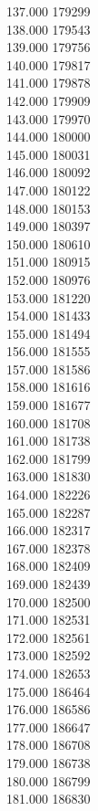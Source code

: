 { 137.000	179299 \\
 138.000	179543 \\
 139.000	179756 \\
 140.000	179817 \\
 141.000	179878 \\
 142.000	179909 \\
 143.000	179970 \\
 144.000	180000 \\
 145.000	180031 \\
 146.000	180092 \\
 147.000	180122 \\
 148.000	180153 \\
 149.000	180397 \\
 150.000	180610 \\
 151.000	180915 \\
 152.000	180976 \\
 153.000	181220 \\
 154.000	181433 \\
 155.000	181494 \\
 156.000	181555 \\
 157.000	181586 \\
 158.000	181616 \\
 159.000	181677 \\
 160.000	181708 \\
 161.000	181738 \\
 162.000	181799 \\
 163.000	181830 \\
 164.000	182226 \\
 165.000	182287 \\
 166.000	182317 \\
 167.000	182378 \\
 168.000	182409 \\
 169.000	182439 \\
 170.000	182500 \\
 171.000	182531 \\
 172.000	182561 \\
 173.000	182592 \\
 174.000	182653 \\
 175.000	186464 \\
 176.000	186586 \\
 177.000	186647 \\
 178.000	186708 \\
 179.000	186738 \\
 180.000	186799 \\
 181.000	186830 \\
}
